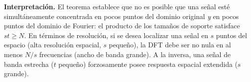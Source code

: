 \documentclass[12pt]{article}
\begin{document}
\medskip

\noindent\textbf{Interpretación.}  El teorema establece que no es posible que una señal esté simultáneamente concentrada en pocos puntos del dominio original \emph{y} en pocos puntos del dominio de Fourier: el producto de los tamaños de soporte satisface $st \geq N$. En términos de resolución, si se desea localizar una señal en $s$ puntos del espacio (alta resolución espacial, $s$ pequeño), la DFT debe ser no nula en al menos $N/s$ frecuencias (ancho de banda grande). A la inversa, una señal de banda estrecha ($t$ pequeño) forzosamente posee respuesta espacial extendida ($s$ grande).
\end{document}
